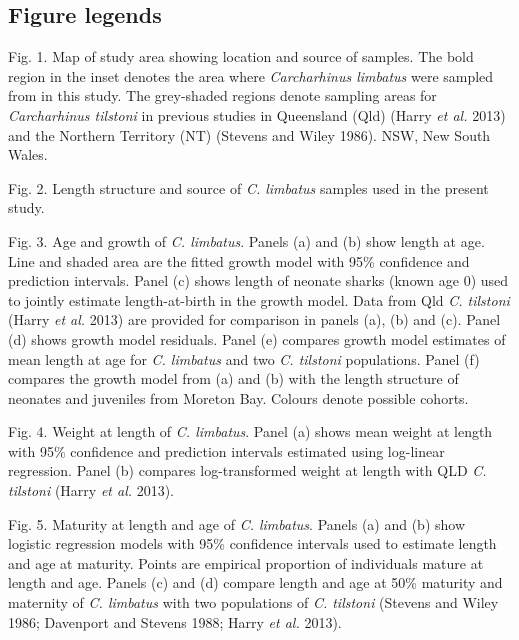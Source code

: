 \documentclass[]{article}
\title{}
\author{}
\date{}
\begin{document}
\hypertarget{figure-legends}{%
\subsection{Figure legends}\label{figure-legends}}

Fig. 1. Map of study area showing location and source of samples. The
bold region in the inset denotes the area where \emph{Carcharhinus
limbatus} were sampled from in this study. The grey-shaded regions
denote sampling areas for \emph{Carcharhinus tilstoni} in previous
studies in Queensland (Qld) (Harry \emph{et al.} 2013) and the Northern
Territory (NT) (Stevens and Wiley 1986). NSW, New South Wales.

Fig. 2. Length structure and source of \emph{C. limbatus} samples used
in the present study.

Fig. 3. Age and growth of \emph{C. limbatus}. Panels (a) and (b) show
length at age. Line and shaded area are the fitted growth model with
95\% confidence and prediction intervals. Panel (c) shows length of
neonate sharks (known age 0) used to jointly estimate length-at-birth in
the growth model. Data from Qld \emph{C. tilstoni} (Harry \emph{et al.}
2013) are provided for comparison in panels (a), (b) and (c). Panel (d)
shows growth model residuals. Panel (e) compares growth model estimates
of mean length at age for \emph{C. limbatus} and two \emph{C. tilstoni}
populations. Panel (f) compares the growth model from (a) and (b) with
the length structure of neonates and juveniles from Moreton Bay. Colours
denote possible cohorts.

Fig. 4. Weight at length of \emph{C. limbatus}. Panel (a) shows mean
weight at length with 95\% confidence and prediction intervals estimated
using log-linear regression. Panel (b) compares log-transformed weight
at length with QLD \emph{C. tilstoni} (Harry \emph{et al.} 2013).

Fig. 5. Maturity at length and age of \emph{C. limbatus}. Panels (a) and
(b) show logistic regression models with 95\% confidence intervals used
to estimate length and age at maturity. Points are empirical proportion
of individuals mature at length and age. Panels (c) and (d) compare
length and age at 50\% maturity and maternity of \emph{C. limbatus} with
two populations of \emph{C. tilstoni} (Stevens and Wiley 1986; Davenport
and Stevens 1988; Harry \emph{et al.} 2013).
\end{document}
